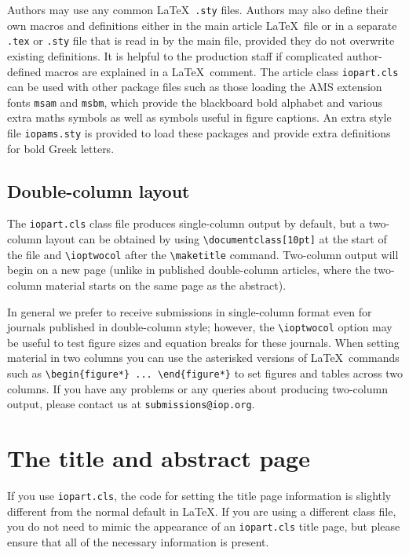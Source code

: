 \documentclass[12pt]{iopart}
\begin{document}
Authors may use any common \LaTeX\ \verb".sty" files.
Authors may also define their own macros and definitions either in the main article \LaTeX\ file
or in a separate \verb".tex" or \verb".sty" file that is read in by the
main file, provided they do not overwrite existing definitions.
It is helpful to the production staff if complicated author-defined macros are explained in a \LaTeX\ comment.
The article class \verb"iopart.cls" can be used with other package files such
as those loading the AMS extension fonts 
\verb"msam" and \verb"msbm", which provide the 
blackboard bold alphabet and various extra maths symbols as well as symbols useful in figure 
captions.  An extra style file \verb"iopams.sty" is provided to load these
packages and provide extra definitions for bold Greek letters.

\subsection{\label{dblcol}Double-column layout}
The \verb"iopart.cls" class file produces single-column output by default, but a two-column layout can be obtained by
using \verb"\documentclass[10pt]" at the start of the file and \verb"\ioptwocol" after the \verb"\maketitle" command.  Two-column output will begin
on a new page (unlike in published double-column articles, where the two-column material
starts on the same page as the abstract).

In general we prefer to receive submissions in single-column format even for journals
published in double-column style; however, the \verb"\ioptwocol" option may be useful to test figure sizes
and equation breaks for these journals.  When setting material
in two columns you can use the asterisked versions of \LaTeX\ commands such as \verb"\begin{figure*} ... \end{figure*}"
to set figures and tables across two columns.  If you have any problems or any queries about producing two-column output, please contact us at \verb"submissions@iop.org".

\section{The title and abstract page} 
If you use \verb"iopart.cls", the code for setting the title page information is slightly different from
the normal default in \LaTeX.  If you are using a different class file, you do not need to mimic the appearance of
an \verb"iopart.cls" title page, but please ensure that all of the necessary information is present.
\end{document}
